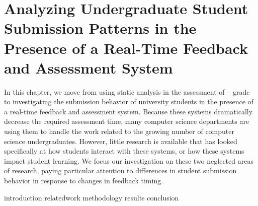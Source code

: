 \chapter{Analyzing Undergraduate Student Submission Patterns in the Presence of
  a Real-Time Feedback and Assessment System}
\label{chap:feedback}

\def\currentprefix{feedback}

In this chapter, we move from using static analysis in the assessment of
-- grade  to investigating the submission behavior of
university students in the presence of a real-time feedback and assessment
system. Because these systems dramatically decrease the required assessment
time, many computer science departments are using them to handle the work
related to the growing number of computer science undergraduates. However,
little research is available that has looked specifically at how students
interact with these systems, or how these systems impact student learning. We
focus our investigation on these two neglected areas of research, paying
particular attention to differences in student submission behavior in response
to changes in feedback timing.

\iffull
{introduction}
{relatedwork}
{methodology}
{results}
{conclusion}
\fi
